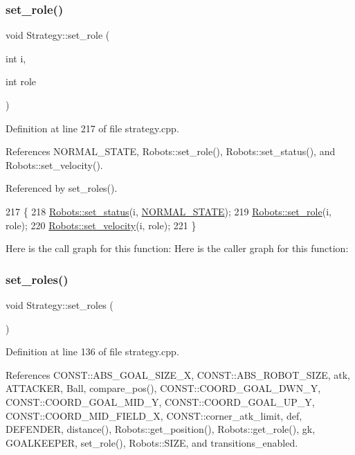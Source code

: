 \subsubsection{\texorpdfstring{set\+\_\+role()}{set\_role()}}
{\footnotesize\ttfamily void Strategy\+::set\+\_\+role (\begin{DoxyParamCaption}\item[{int}]{i,  }\item[{int}]{role }\end{DoxyParamCaption})}



Definition at line 217 of file strategy.\+cpp.



References N\+O\+R\+M\+A\+L\+\_\+\+S\+T\+A\+TE, Robots\+::set\+\_\+role(), Robots\+::set\+\_\+status(), and Robots\+::set\+\_\+velocity().



Referenced by set\+\_\+roles().


\begin{DoxyCode}
217                                        \{
218     \hyperlink{class_robots_aa287cd821cfe9c6c65fb5cdfd77c5050}{Robots::set\_status}(i, \hyperlink{strategy_8cpp_a71fb3922bc79c3f8414c394f631c7c84}{NORMAL\_STATE});
219     \hyperlink{class_robots_a3694b6380b113b7c38a252fd3bbfcca3}{Robots::set\_role}(i, role);
220     \hyperlink{class_robots_ae37da9b7ca9d84bee564c328db139758}{Robots::set\_velocity}(i, role);
221 \}
\end{DoxyCode}
Here is the call graph for this function\+:
Here is the caller graph for this function\+:
\mbox{\label{class_strategy_a35458436b6f9d4f080ce8415af3dc599}} 
\subsubsection{\texorpdfstring{set\+\_\+roles()}{set\_roles()}}
{\footnotesize\ttfamily void Strategy\+::set\+\_\+roles (\begin{DoxyParamCaption}{ }\end{DoxyParamCaption})}



Definition at line 136 of file strategy.\+cpp.



References C\+O\+N\+S\+T\+::\+A\+B\+S\+\_\+\+G\+O\+A\+L\+\_\+\+S\+I\+Z\+E\+\_\+X, C\+O\+N\+S\+T\+::\+A\+B\+S\+\_\+\+R\+O\+B\+O\+T\+\_\+\+S\+I\+ZE, atk, A\+T\+T\+A\+C\+K\+ER, Ball, compare\+\_\+pos(), C\+O\+N\+S\+T\+::\+C\+O\+O\+R\+D\+\_\+\+G\+O\+A\+L\+\_\+\+D\+W\+N\+\_\+Y, C\+O\+N\+S\+T\+::\+C\+O\+O\+R\+D\+\_\+\+G\+O\+A\+L\+\_\+\+M\+I\+D\+\_\+Y, C\+O\+N\+S\+T\+::\+C\+O\+O\+R\+D\+\_\+\+G\+O\+A\+L\+\_\+\+U\+P\+\_\+Y, C\+O\+N\+S\+T\+::\+C\+O\+O\+R\+D\+\_\+\+M\+I\+D\+\_\+\+F\+I\+E\+L\+D\+\_\+X, C\+O\+N\+S\+T\+::corner\+\_\+atk\+\_\+limit, def, D\+E\+F\+E\+N\+D\+ER, distance(), Robots\+::get\+\_\+position(), Robots\+::get\+\_\+role(), gk, G\+O\+A\+L\+K\+E\+E\+P\+ER, set\+\_\+role(), Robots\+::\+S\+I\+ZE, and transitions\+\_\+enabled.



